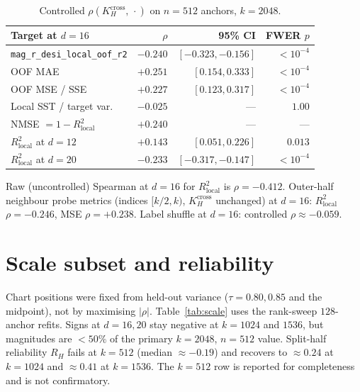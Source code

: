 \begin{table}[h]
\caption{Controlled $\rho(K_H^{\mathrm{cross}},\,\cdot)$ on $n{=}512$ anchors, $k{=}2048$.}
\label{tab:metrics}
\centering
\footnotesize
\begin{tabular}{lrrr}
\toprule
Target at $d{=}16$ & $\rho$ & 95\% CI & FWER $p$ \\
\midrule
\texttt{mag\_r\_desi\_local\_oof\_r2} & $-0.240$ & $[-0.323,-0.156]$ & ${<}10^{-4}$ \\
OOF MAE & $+0.251$ & $[0.154,0.333]$ & ${<}10^{-4}$ \\
OOF MSE / SSE & $+0.227$ & $[0.123,0.317]$ & ${<}10^{-4}$ \\
Local SST / target var.\ & $-0.025$ & --- & $1.00$ \\
NMSE $=1-R^{2}_{\mathrm{local}}$ & $+0.240$ & --- & --- \\
\midrule
$R^{2}_{\mathrm{local}}$ at $d{=}12$ & $+0.143$ & $[0.051,0.226]$ & $0.013$ \\
$R^{2}_{\mathrm{local}}$ at $d{=}20$ & $-0.233$ & $[-0.317,-0.147]$ & ${<}10^{-4}$ \\
\bottomrule
\end{tabular}
\end{table}

Raw (uncontrolled) Spearman at $d{=}16$ for $R^{2}_{\mathrm{local}}$ is $\rho{=}-0.412$. Outer-half neighbour probe metrics (indices $[k/2,k)$, $K_H^{\mathrm{cross}}$ unchanged) at $d{=}16$: $R^{2}_{\mathrm{local}}$ $\rho{=}-0.246$, MSE $\rho{=}+0.238$. Label shuffle at $d{=}16$: controlled $\rho{\approx}-0.059$.

\section{Scale subset and reliability}
\label{app:scale}

Chart positions were fixed from held-out variance ($\tau{=}0.80,0.85$ and the midpoint), not by maximising $|\rho|$. Table~\ref{tab:scale} uses the rank-sweep $128$-anchor refits. Signs at $d{=}16,20$ stay negative at $k{=}1024$ and $1536$, but magnitudes are ${<}50\%$ of the primary $k{=}2048$, $n{=}512$ value. Split-half reliability $R_{H}$ fails at $k{=}512$ (median $\approx-0.19$) and recovers to $\approx0.24$ at $k{=}1024$ and $\approx0.41$ at $k{=}1536$. The $k{=}512$ row is reported for completeness and is not confirmatory.

